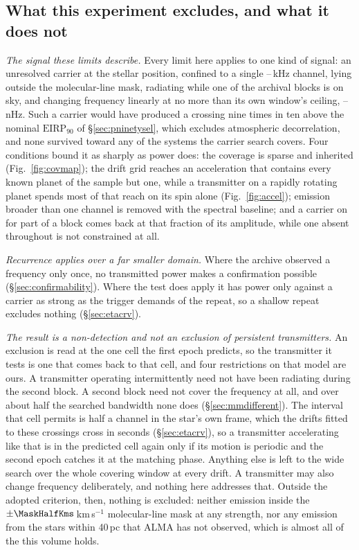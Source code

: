 \subsection{What this experiment excludes, and what it does not}
\label{sec:excludes}

\noindent\emph{The signal these limits describe.} Every limit here applies to
one kind of signal: an unresolved carrier at the stellar position, confined to
a single \ChanLoA--\ChanHiA\,kHz channel, lying outside the molecular-line
mask, radiating while one of the archival blocks is on sky, and changing
frequency linearly at no more than its own window's ceiling,
\DriftCeilLo--\DriftCeilHi\,nHz. Such a carrier would
have produced a crossing nine times in ten above the nominal
$\mathrm{EIRP}_{90}$ of \S\ref{sec:pninetysel}, which excludes atmospheric
decorrelation, and none survived toward any of the \NSysClassA{}
systems the carrier search covers. Four conditions
bound it as sharply as power does: the coverage is sparse and
inherited (Fig.~\ref{fig:covmap}); the drift grid reaches an acceleration that contains every
known planet of the sample but one, while a transmitter on a rapidly rotating
planet spends most of that reach on its spin alone (Fig.~\ref{fig:accel}); emission broader than one channel is
removed with the spectral baseline; and a carrier on for part of a block comes
back at that fraction of its amplitude, while one absent throughout is not
constrained at all.

\noindent\emph{Recurrence applies over a far smaller domain.} Where the
archive observed a frequency only once, no transmitted power makes a
confirmation possible (\S\ref{sec:confirmability}). Where the test does apply
it has power only against a carrier as strong as the trigger demands of the
repeat, so a shallow repeat excludes nothing (\S\ref{sec:etacrv}).

\noindent\emph{The result is a non-detection and not an exclusion of
persistent transmitters.} An exclusion is read at the one cell the first
epoch predicts, so the transmitter it tests is one that comes back to that
cell, and four restrictions on that model are
ours. A transmitter operating intermittently need not have been radiating
during the second block. A second block need not cover the frequency at all,
and over about half the searched bandwidth none does
(\S\ref{sec:mmdifferent}). The interval that cell permits is half a channel in the star's own frame,
which the drifts fitted to these crossings cross in seconds
(\S\ref{sec:etacrv}), so a transmitter accelerating like that is in the
predicted cell again only if its motion is periodic and the second epoch
catches it at the matching phase. Anything else is left to the wide search
over the whole covering window at every drift. A transmitter may also change frequency deliberately,
and nothing here addresses that. Outside the adopted criterion, then, nothing
is excluded: neither emission inside the
$\pm\MaskHalfKms$\,km\,s$^{-1}$ molecular-line mask at any strength, nor any
emission from the stars within 40\,pc that ALMA has not
observed, which is almost all of the \NGaiaCensus{} this volume holds.

